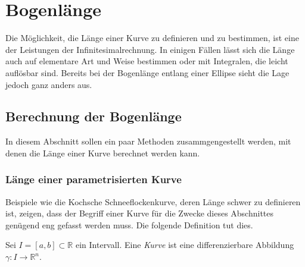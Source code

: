 %
%
%
\section{Bogenlänge 
\label{buch:geometrie:section:ellipsenbogen}}
Die Möglichkeit, die Länge einer Kurve zu definieren und zu bestimmen,
ist eine der Leistungen der Infinitesimalrechnung.
In einigen Fällen lässt sich die Länge auch auf elementare Art und
Weise bestimmen oder mit Integralen, die leicht auflösbar sind.
Bereits bei der Bogenlänge entlang einer Ellipse sieht die Lage
jedoch ganz anders aus.

%
%
\subsection{Berechnung der Bogenlänge}
In diesem Abschnitt sollen ein paar Methoden zusammgengestellt werden,
mit denen die Länge einer Kurve berechnet werden kann.

%
%
\subsubsection{Länge einer parametrisierten Kurve}
Beispiele wie die Kochsche Schneeflockenkurve, deren Länge schwer
zu definieren ist, zeigen, dass der Begriff einer Kurve für die Zwecke
dieses Abschnittes genügend eng gefasst werden muss.
Die folgende Definition tut dies.

\begin{definition}
\label{buch:geometrie:def:kurve}
Sei $I=[a,b]\subset\mathbb{R}$ ein Intervall.
Eine {\em Kurve} ist eine differenzierbare Abbildung
$\gamma \colon I \to \mathbb{R}^n$.
\end{definition}

